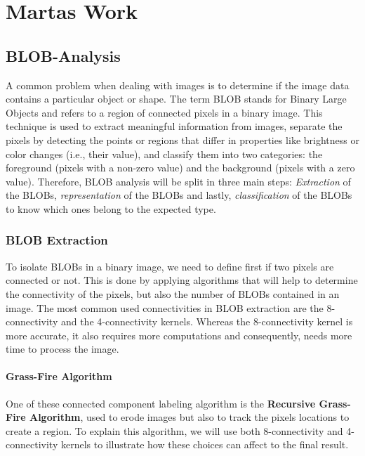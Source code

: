 \chapter{Martas Work}

\section{BLOB-Analysis}
A common problem when dealing with images is to determine if the image data contains a particular object or shape. The term BLOB stands for Binary Large Objects and refers to a region of connected pixels in a binary image. This technique is used to extract meaningful information from images, separate the pixels by detecting the points or regions that differ in properties like brightness or color changes (i.e., their value), and classify them into two categories: the foreground (pixels with a non-zero value) and the background (pixels with a zero value).
Therefore, BLOB analysis will be split in three main steps: \textit{Extraction} of the BLOBs, \textit{representation} of the BLOBs and lastly, \textit{classification} of the BLOBs to know which ones belong to the expected type.
\subsection{BLOB Extraction}
To isolate BLOBs in a binary image, we need to define first if two pixels are connected or not. This is done by applying algorithms that will help to determine the connectivity of the pixels, but also the number of BLOBs contained in an image. The most common used connectivities in BLOB extraction are the 8-connectivity and the 4-connectivity kernels. Whereas the 8-connectivity kernel is more accurate, it also requires more computations and consequently, needs more time to process the image.


\subsubsection{Grass-Fire Algorithm}
One of these connected component labeling algorithm is the \textbf{Recursive Grass-Fire Algorithm}, used to erode images but also to track the pixels locations to create a region.
To explain this algorithm, we will use both 8-connectivity and 4-connectivity kernels to illustrate how these choices can affect to the final result.

